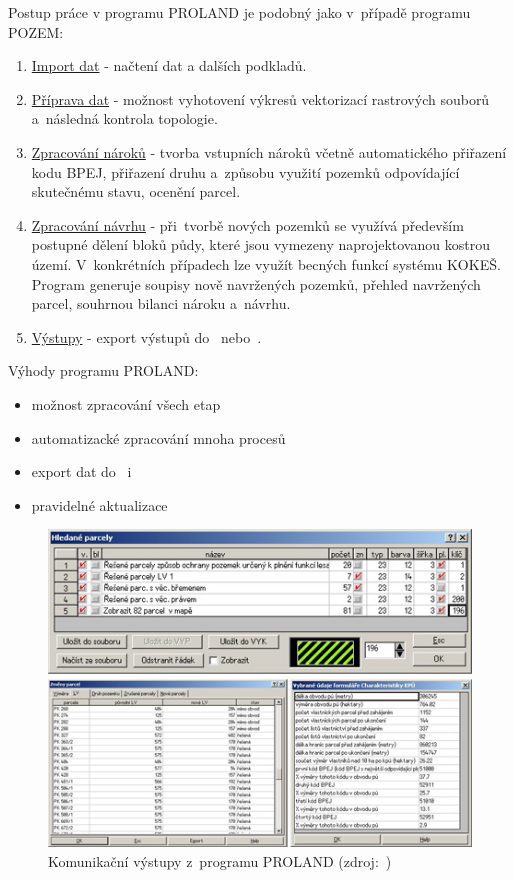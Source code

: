 Postup práce v programu PROLAND je podobný jako v~případě programu POZEM:
	\begin{enumerate}[leftmargin=1.5cm, noitemsep]
		\item \underline{Import dat} - načtení dat  a dalších podkladů.
		\item \underline{Příprava dat} - možnost vyhotovení výkresů vektorizací rastrových souborů a~následná kontrola topologie.
		\item \underline{Zpracování nároků} - tvorba vstupních nároků včetně automatického přiřazení kodu BPEJ, přiřazení druhu a~způsobu využití pozemků odpovídající skutečnému stavu, ocenění parcel.
		\item \underline{Zpracování návrhu} - při~tvorbě nových pozemků se využívá především postupné dělení bloků půdy, které jsou vymezeny naprojektovanou kostrou území. V~konkrétních případech lze využít becných funkcí systému KOKEŠ. Program generuje soupisy nově navržených pozemků, přehled navržených parcel, souhrnou bilanci nároku a~návrhu.
		\item \underline{Výstupy} - export výstupů do~ nebo~.
	\end{enumerate}

Výhody programu PROLAND:
	\begin{itemize}[leftmargin=1.5cm, noitemsep]
		\item možnost zpracování všech etap 
		\item automatizacké zpracování mnoha procesů 
		\item export dat do~ i~
		\item pravidelné aktualizace
	\end{itemize}

	\begin{figure}[H]
		\centering
		\includegraphics[width=.8\textwidth]{./pictures/proland.png}
		\caption[Komunikační výstupy z~programu PROLAND]{Komunikační výstupy z~programu PROLAND (zdroj:~\citep{proland_obrazek})}
		\label{fig:proland_obrazek}
 	\end{figure}

